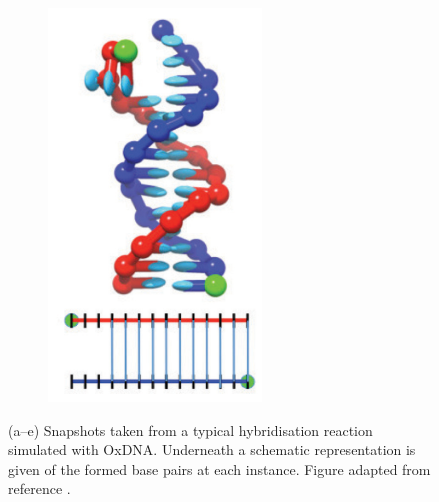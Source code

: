 \begin{figure}[ht]
\begin{centering}
\begin{subfigure}[t]{\dimexpr.2\linewidth-1.3em\relax}
  \includegraphics[width=.8\linewidth,valign=t]{Figures/hybridDiag5.png}
  \end{subfigure}
  \caption[Snapshots of DNA hybridisation reaction taken from a typical
      trajectory.]{{\linespread{0.1}\small
      (a--e) Snapshots taken from a typical hybridisation
      reaction simulated with OxDNA. Underneath a schematic representation is given of
  the formed base pairs at each instance. Figure adapted from reference
  \cite{Ouldridge2013}.}}
  \label{fig:hybridization}
  \end{centering}

\end{figure}

